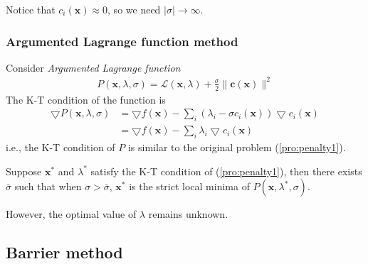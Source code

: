 Notice that $c_i(\mathbf{x}) \approx 0$, so we need
$|\sigma| \rightarrow \infty $.

\subsubsection{Argumented Lagrange function method}
Consider \emph{Argumented Lagrange function}
\begin{align}
    P(\mathbf{x}, \lambda, \sigma) = 
    \mathcal{L}(\mathbf{x}, \lambda) + 
    \frac{\sigma}{2} \parallel \mathbf{c}
    (\mathbf{x}) \parallel^2
\end{align}
The K-T condition of the function is
\begin{align}
    \bigtriangledown P(\mathbf{x}, \lambda, \sigma) &= 
    \bigtriangledown f(\mathbf{x}) - 
    \sum_i (\lambda_i - \sigma c_i(\mathbf{x})) \bigtriangledown
    c_i(\mathbf{x}) \\ &=
    \bigtriangledown f(\mathbf{x}) - 
    \sum_i \lambda_i \bigtriangledown
    c_i(\mathbf{x})
\end{align}
i.e., the K-T condition of $P$ is similar to the original
problem (\ref{pro:penalty1}).
\begin{theorem}
    Suppose $\mathbf{x}^*$ and $\lambda^*$ satisfy
    the K-T condition of (\ref{pro:penalty1}),
    then there exists $\bar{\sigma}$ such that
    when $\sigma > \bar{\sigma}$,
    $\mathbf{x}^*$ is the strict local minima
    of $P(\mathbf{x}, \lambda^*, \sigma)$.
\end{theorem}

However, the optimal value of $\lambda$ remains
unknown.

\subsection{Barrier method}
